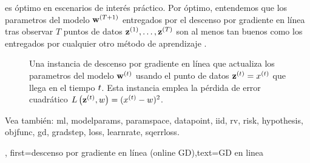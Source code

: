 {{es óptimo en escenarios de interés práctico. Por óptimo, entendemos que los parametros del modelo
${\bf w}^{(T+1)}$ entregados por el descenso por gradiente en línea tras observar $T$ puntos de datos ${\bf z}^{(1)},\ldots, {\bf z}^{(T)}$ 
son al menos tan buenos como los entregados por cualquier otro método de aprendizaje \cite{HazanOCO,GDOptimalRakhlin2012}. 
\begin{figure}[H]
	\begin{center}
\end{center} 
\caption{Una instancia de descenso por gradiente en línea que actualiza los parametros del modelo ${\bf w}^{(t)}$ 
usando el punto de datos ${\bf z}^{(t)} = x^{(t)}$ que llega en el tiempo $t$. 
Esta instancia emplea la pérdida de error cuadrático $L\left({\bf z}^{(t)},w \right) = (x^{(t)} - w)^{2}$.
}
\end{figure}
Vea también: \gls{ml}, \gls{modelparams}, \gls{paramspace}, \gls{datapoint}, \gls{iid}, \gls{rv}, \gls{risk}, \gls{hypothesis}, \gls{objfunc}, \gls{gd}, \gls{gradstep}, \gls{loss}, \gls{learnrate}, \gls{sqerrloss}.},
first={descenso por gradiente en línea (online GD)},text={GD en linea}}

